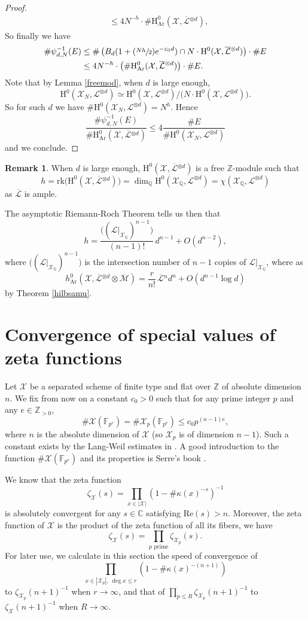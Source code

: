 \documentclass[JEP,XML,SOM,Unicode,published]{cedram}
\newcommand{\Psfrac}[2]{(\sfrac{#1}{#2})}
\theoremstyle{plain}
\theoremstyle{definition}
\newtheorem*{rmq}{Remark}
\newcommand{\ho}{\mathrm{H}}
\newcommand{\X}{\mathcal{X}}
\newcommand{\Li}{\overline{\mathcal{L}}{}}
\newcommand{\li}{\mathcal{L}}
\newcommand{\Q}{\mathbb{Q}}
\newcommand{\Z}{\mathbb{Z}}
\newcommand{\bbC}{\mathbb{C}}
\newcommand{\F}{\mathbb{F}}
\begin{document}
\begin{proof}[Proof]
\begin{align*}
&\leq 4N^{-h}\cdot \#\ho^0_{\mathrm{Ar}}(\X,\Li^{\otimes d}),
\end{align*}
So finally we have
\begin{align*}
\#\psi_{d,N}^{-1}(E)&\leq \#\left(B_d(1+\Psfrac{Nh}{2}e^{-\varepsilon_0 d}) \cap N\cdot \ho^0(\X,\Li^{\otimes d}) \right)\cdot \#E\\
&\leq 4N^{-h}\cdot \left(\#\ho^0_{\mathrm{Ar}}(\X,\Li^{\otimes d})\right)\cdot \#E.
\end{align*}
Note that by Lemma \ref{freemod}, when $d$ is large enough,
\[
\ho^0(\X_N,\li^{\otimes d})\simeq\ho^0(\X,\li^{\otimes d})/\big(N\cdot \ho^0(\X,\li^{\otimes d})\big).
\]
So for such $d$ we have $\#\ho^0(\X_{N},\li^{\otimes d})=N^{h}$. Hence
\[
\frac{\#\psi_{d,N}^{-1}(E)}{\#\ho^0_{\mathrm{Ar}}(\X,\Li^{\otimes d})}\leq 4\frac{\#E}{\#\ho^0(\X_{N},\li^{\otimes d})}
\]
and we conclude.
\end{proof}

\begin{rmq}
When $d$ is large enough, $\ho^0 (\X,\Li^{\otimes d})$ is a free $\Z$-module such that
\[
h=\mathrm{rk}\big(\ho^0(\X,\Li^{\otimes d})\big)=\dim_{\Q}\ho^0(\X_{\Q},\li^{\otimes d})=\chi(\X_{\Q}, \li^{\otimes d})
\]
as $\Li$ is ample.

The asymptotic Riemann-Roch Theorem tells us then that
\[
h=\frac{\big((\li|_{\X_{\Q}})^{n-1} \big)}{(n-1)!}\, d^{n-1}+O(d^{n-2}),
\]
where $\big((\li|_{\X_{\Q}})^{n-1} \big)$ is the intersection number of $n-1$ copies of $\li |_{\X_\Q}$, where as
\[
h^0_{\mathrm{Ar}}(\X,\Li^{\otimes d}\otimes \overline{\mathcal{M}})= \frac{r}{n!}\,\Li^{n} d^n+O(d^{n-1}\log d)
\]
by Theorem \ref{hilbsamu}.
\end{rmq}

\section{Convergence of special values of zeta functions}\label{c0}
Let $\X$ be a separated scheme of finite type and flat over $\Z$ of absolute dimension~$n$. We fix from now on a constant $c_0>0$ such that for any prime integer $p$ and any $e\in \Z_{>0}$,
\[
\#\X(\F_{p^e})=\#\X_{p}(\F_{p^e})\leq c_0p^{(n-1)e},
\]
where $n$ is the absolute dimension of $\X$ (so $\X_p$ is of dimension $n-1$). Such a constant exists by the Lang-Weil estimates in \cite{LW54}. A good introduction to the function $\#\X(\F_{p^e})$ and its properties is Serre's book \cite{Se12}.

We know that the zeta function
\[
\zeta_{\X}(s)= \prod_{x\in |\X|}(1-\#\kappa(x)^{-s})^{-1}
\]
is absolutely convergent for any $s\in \bbC$ satisfying $\mathrm{Re}(s)>n$. Moreover, the zeta function of $\X$ is the product of the zeta function of all its fibers, \ie we have
\[
\zeta_{\X}(s)=\prod_{p\text{ prime}} \zeta_{\X_p}(s).
\]
For later use, we calculate in this section the speed of convergence of
\[
\prod_{x\in |\X_p|,\ \deg x\leq r}(1-\#\kappa(x)^{-(n+1)})
\]
to $\zeta_{\X_p}(n+1)^{-1}$ when $r\to \infty$, and that of $\prod_{p\leq R} \zeta_{\X_p}(n+1)^{-1}$ to $\zeta_{\X}(n+1)^{-1}$ when $R\to \infty$.
\end{document}
